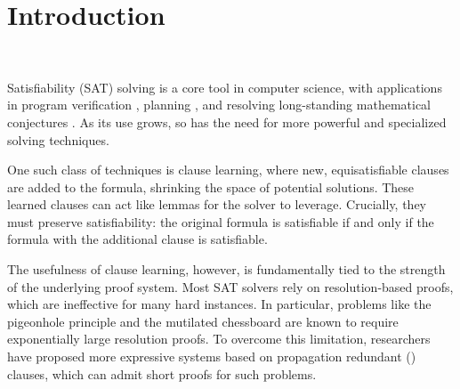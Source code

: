 \section{Introduction}~\label{sec:intro}


Satisfiability (SAT) solving is a core tool in computer science, with applications in program verification \cite{BillionQueries}, planning \cite{planning}, and resolving long-standing mathematical conjectures \cite{chromaticnumber}. As its use grows, so has the need for more powerful and specialized solving techniques.

One such class of techniques is clause learning, where new, equisatisfiable clauses are added to the formula, shrinking the space of potential solutions. These learned clauses can act like lemmas for the solver to leverage. Crucially, they must preserve satisfiability: the original formula is satisfiable if and only if the formula with the additional clause is satisfiable.



The usefulness of clause learning, however, is fundamentally tied to the strength of the underlying proof system. Most SAT solvers rely on resolution-based proofs, which are ineffective for many hard instances. In particular, problems like the pigeonhole principle and the mutilated chessboard are known to require exponentially large resolution proofs. To overcome this limitation, researchers have proposed more expressive systems based on propagation redundant (\pr) clauses, which can admit short proofs for such problems.

